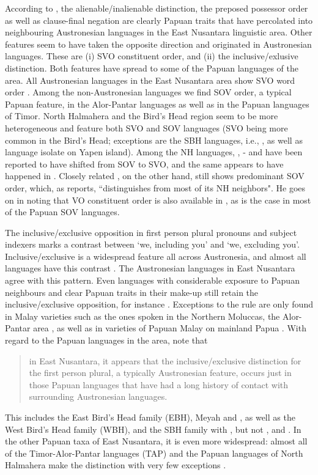According to \citet{klamer2008east}, the alienable/inalienable distinction, the preposed possessor order as well as clause-final negation are clearly Papuan traits that have percolated into neighbouring Austronesian languages in the East Nusantara linguistic area. Other features seem to have taken the opposite direction and originated in Austronesian languages. These are (i) SVO constituent order, and (ii) the inclusive/exlusive distinction. Both features have spread to some of the Papuan languages of the area. All Austronesian languages in the East Nusantara area show SVO word order \citep[113]{klamer2008east}. Among the non-Austronesian languages we find SOV order, a typical Papuan feature, in the Alor-Pantar languages as well as in the Papuan languages of Timor. North Halmahera and the Bird's Head region seem to be more heterogeneous and feature both SVO and SOV languages (SVO being more common in the Bird's Head; exceptions are the SBH languages, i.e., , as well as language isolate  on Yapen island). Among the NH languages, , - and  have been reported to have shifted from SOV to SVO, and the same appears to have happened in  \citep[114]{klamer2008east}. Closely related , on the other hand, still shows predominant SOV order, which, as \citet[55]{holton2003tobelo} reports, ``distinguishes  from most of its NH neighbors". He goes on in noting that VO constituent order is also available in , as is the case in most of the Papuan SOV languages.

The inclusive/exclusive opposition in first person plural pronouns and subject indexers marks a contrast between `we, including you' and `we, excluding you'. Inclusive/exclusive is a widespread feature all across Austronesia, and almost all languages have this contrast \citep{Tryon1995,klamer2008east}. The Austronesian languages in East Nusantara agree with this pattern. Even languages with considerable exposure to Papuan neighbours and clear Papuan traits in their make-up still retain the inclusive/exclusive opposition, for instance  \citep{klamer2011alorese}. Exceptions to the rule are only found in Malay varieties such as the ones spoken in the Northern Moluccas, the Alor-Pantar area \citep{klamer2008east}, as well as in varieties of Papuan Malay on mainland Papua \citep{kluge2014grammar}. With regard to the Papuan languages in the area, \citet[115]{klamer2008east} note that \begin{quote}in East Nusantara, it appears that the inclusive/exclusive distinction for the first person plural, a typically Austronesian feature,
occurs just in those Papuan languages that have had a long history of contact with surrounding Austronesian languages.\end{quote}
This includes the East Bird's Head family (EBH), Meyah and , as well as the West Bird's Head family (WBH), and the SBH family with , but not ,  and . In the other Papuan taxa of East Nusantara, it is even more widespread: almost all of the Timor-Alor-Pantar languages (TAP) and the Papuan languages of North Halmahera make the distinction with very few exceptions \citep[115]{klamer2008east}. 

